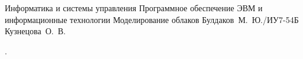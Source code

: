 \documentclass{bmstu}[a4paper]
\begin{document}
\makecourseworktitle
{Информатика и системы управления} %
{Программное обеспечение ЭВМ и информационные технологии} %
{Моделирование облаков} %
{Булдаков~М.~Ю./ИУ7-54Б} %
{Кузнецова~О.~В.} %
{} %

.
\maketableofcontents









\makebibliography


\end{document}
